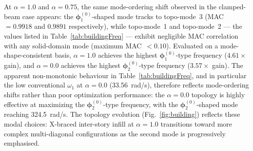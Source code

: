 \documentclass[pdflatex,lineno,sn-mathphys-ay]{sn-jnl}
\begin{document}
At $\alpha=1.0$ and $\alpha=0.75$, the same mode-ordering shift observed in the clamped-beam case appears: the $\boldsymbol{\phi}_1^{(0)}$-shaped mode tracks to topo-mode~3 (MAC~$=0.9918$ and $0.9891$ respectively), while topo-mode~1 and topo-mode~2 — the values listed in Table~\ref{tab:buildingFreq} — exhibit negligible MAC correlation with any solid-domain mode (maximum MAC~$<0.10$). Evaluated on a mode-shape-consistent basis, $\alpha=1.0$ achieves the highest $\boldsymbol{\phi}_1^{(0)}$-type frequency ($4.61\times$ gain), and $\alpha=0.0$ achieves the highest $\boldsymbol{\phi}_2^{(0)}$-type frequency ($3.57\times$ gain). The apparent non-monotonic behaviour in Table~\ref{tab:buildingFreq}, and in particular the low conventional $\omega_1$ at $\alpha=0.0$ (33.56~rad/s), therefore reflects mode-ordering shifts rather than poor optimization performance: the $\alpha=0.0$ topology is highly effective at maximizing the $\boldsymbol{\phi}_2^{(0)}$-type frequency, with the $\boldsymbol{\phi}_2^{(0)}$-shaped mode reaching 324.5~rad/s. The topology evolution (Fig.~\ref{fig:building}) reflects these modal choices: X-braced inter-story infill at $\alpha=1.0$ transitions toward more complex multi-diagonal configurations as the second mode is progressively emphasised.
\end{document}

